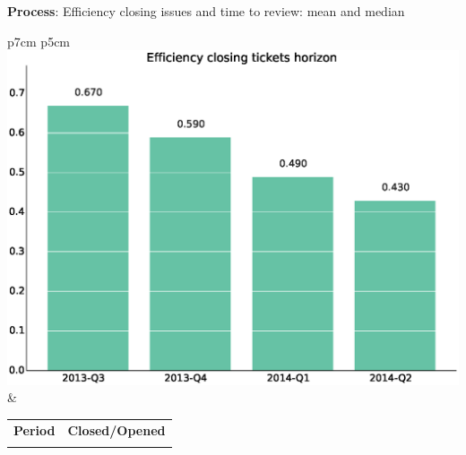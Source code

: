 \documentclass[a4wide,11pt]{report}
\begin{document}
\textbf{Process}: Efficiency closing issues and time to review: mean and median

\begin{tabular}{p{7cm} p{5cm}}
    \vspace{0pt} 
    \includegraphics[scale=.35]{figs/bmihorizon.eps}
    & 
    \vspace{0pt}
    \begin{tabular}{l|l}%
    \bfseries Period & \bfseries Closed/Opened %
    \csvreader[head to column names]{data/bmihorizon.csv}{}%
    {\\ & \bmi}
    \end{tabular}
\end{tabular}
\end{document}
